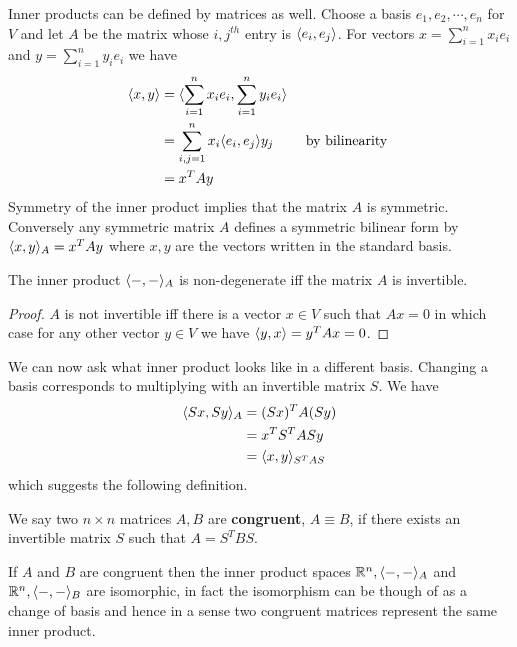 Inner products can be defined by matrices as well. Choose a basis $e_1, e_2, \cdots, e_n$ for $V$ and let $A$ be the matrix whose $i,j^{th}$ entry is $\langle e_i, e_j \rangle$. For vectors $x = \sum _ {i=1}^n x_i e_i$ and $y = \sum _ {i=1}^n y_i e_i$ we have
\begin{align}
	\langle x, y \rangle
	  & = \langle \sum \limits _ {i=1}^n x_i e_i, \sum \limits _ {i=1}^n y_i e_i \rangle \\
	  & = \sum \limits _ {i,j=1}^n  x_i\langle e_i, e_j \rangle y_j
	  & \mbox{ by bilinearity }                                                   \\
	  & = x^T A y
\end{align}
Symmetry of the inner product implies that the matrix $A$ is symmetric. Conversely any symmetric matrix $A$ defines a symmetric bilinear form by $\langle x, y \rangle_A = x^T A y$ where $x,y$ are the vectors written in the standard basis.

\begin{proposition}
	The inner product $\langle -, - \rangle_A$ is non-degenerate iff the matrix $A$ is invertible.
\end{proposition}
\begin{proof}
	$A$ is not invertible iff there is a vector $x \in V$ such that $Ax = 0$ in which case for any other vector $y \in V$ we have $\langle y, x \rangle = y^T A x = 0$.
\end{proof}

We can now ask what inner product looks like in a different basis. Changing a basis corresponds to multiplying with an invertible matrix $S$. We have
\begin{align}
	\langle Sx, Sy \rangle_A
	  & = (Sx)^T A (Sy)           \\
	  & = x^T S^T A S y           \\
	  & = \langle x, y \rangle_{S^T A S}
\end{align}
which suggests the following definition.

\begin{definition}
	We say two $n \times n$ matrices $A,B$ are \textbf{congruent}, $A \equiv B$, if there exists an invertible matrix $S$ such that $A = S^T B S$.
\end{definition}
If $A$ and $B$ are congruent then the inner product spaces $\mathbb{R}^n, \langle -, - \rangle_A$ and $\mathbb{R}^n, \langle -, - \rangle_B$ are isomorphic, in fact the isomorphism can be though of as a change of basis and hence in a sense two congruent matrices represent the same inner product.

